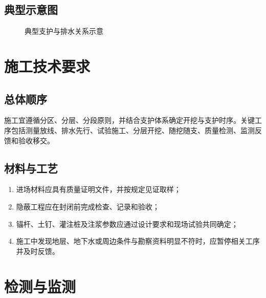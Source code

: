 \documentclass[UTF8,zihao=-4,oneside]{ctexrep}
\begin{document}
\section{典型示意图}
\begin{figure}[H]
  \centering
  \caption{典型支护与排水关系示意}
  \label{fig:typical-support}
\end{figure}

\chapter{施工技术要求}

\section{总体顺序}
施工宜遵循分区、分层、分段原则，并结合支护体系确定开挖与支护时序。关键工序包括测量放线、排水先行、试验施工、分层开挖、随挖随支、质量检测、监测反馈和验收移交。

\section{材料与工艺}
\begin{enumerate}
  \item 进场材料应具有质量证明文件，并按规定见证取样；
  \item 隐蔽工程应在封闭前完成检查、记录和验收；
  \item 锚杆、土钉、灌注桩及注浆参数应通过设计要求和现场试验共同确定；
  \item 施工中发现地层、地下水或周边条件与勘察资料明显不符时，应暂停相关工序并及时反馈。
\end{enumerate}

\chapter{检测与监测}
\end{document}
